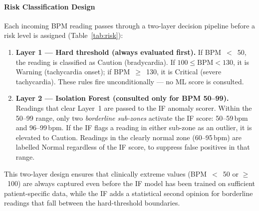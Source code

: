\paragraph{Risk Classification Design}
\label{subsec:risk_design}

Each incoming BPM reading passes through a two-layer decision pipeline before a risk level is assigned (Table~\ref{tab:risk}):

\begin{enumerate}
    \item \textbf{Layer 1 — Hard threshold (always evaluated first).}
    If BPM~$<$~50, the reading is classified as Caution (bradycardia).
    If $100 \leq \text{BPM} < 130$, it is Warning (tachycardia onset);
    if BPM~$\geq$~130, it is Critical (severe tachycardia).
    These rules fire unconditionally --- no ML score is consulted.

    \item \textbf{Layer 2 — Isolation Forest (consulted only for BPM 50--99).}
    Readings that clear Layer~1 are passed to the IF anomaly scorer.
    Within the 50--99 range, only two \emph{borderline sub-zones} activate the
    IF score: 50--59\,bpm and 96--99\,bpm.
    If the IF flags a reading in either sub-zone as an outlier, it is
    elevated to Caution.
    Readings in the clearly normal zone (60--95\,bpm) are labelled Normal
    regardless of the IF score, to suppress false positives in that range.
\end{enumerate}

This two-layer design ensures that clinically extreme values (BPM~$<$~50 or $\geq$~100) are always captured even before the IF model has been trained on sufficient patient-specific data, while the IF adds a statistical second opinion for borderline readings that fall between the hard-threshold boundaries.

